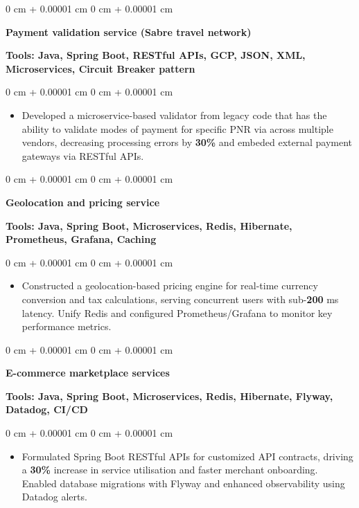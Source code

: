 \documentclass[10pt, letterpaper]{article}
\newenvironment{highlights}{
    \begin{itemize}[
        topsep=0.10 cm,
        parsep=0.10 cm,
        partopsep=0pt,
        itemsep=0pt,
        leftmargin=0 cm + 10pt
    ]
}{
    \end{itemize}
} %
\newenvironment{onecolentry}{
    \begin{adjustwidth}{
        0 cm + 0.00001 cm
    }{
        0 cm + 0.00001 cm
    }
}{
    \end{adjustwidth}
} %
\begin{document}
        \vspace{0.1 cm}
        \begin{onecolentry}
            \textbf{Payment validation service (Sabre travel network)}
        \end{onecolentry}
        \textbf{Tools: Java, Spring Boot, RESTful APIs, GCP, JSON, XML, Microservices, Circuit Breaker pattern}
        
        \vspace{0.10 cm}
        \begin{onecolentry}
            \begin{highlights}
                \item Developed a microservice-based validator from legacy code that has the ability to validate modes of payment for specific PNR via across multiple vendors, decreasing processing errors by \textbf{30\%} and embeded external payment gateways via RESTful APIs.
            \end{highlights}
        \end{onecolentry}
        
        \vspace{0.1 cm}
        \begin{onecolentry}
            \textbf{Geolocation and pricing service}
        \end{onecolentry}
        \textbf{Tools: Java, Spring Boot, Microservices, Redis, Hibernate, Prometheus, Grafana, Caching}
        \vspace{0.10 cm}
        \begin{onecolentry}
            \begin{highlights}
                \item Constructed a geolocation-based pricing engine for real-time currency conversion and tax calculations, serving concurrent users with sub-\textbf{200} ms latency. Unify Redis and configured Prometheus/Grafana to monitor key performance metrics.
            \end{highlights}
        \end{onecolentry}

        \vspace{0.1 cm}

        \begin{onecolentry}
            \textbf{E-commerce marketplace services}
        \end{onecolentry}
        \textbf{Tools: Java, Spring Boot, Microservices, Redis, Hibernate, Flyway, Datadog, CI/CD}
        \vspace{0.10 cm}
        \begin{onecolentry}
            \begin{highlights}
                \item Formulated Spring Boot RESTful APIs for customized API contracts, driving a \textbf{30\%} increase in service utilisation and faster merchant onboarding. Enabled database migrations with Flyway and enhanced observability using Datadog alerts.
                
            \end{highlights}
        \end{onecolentry}
    
\end{document}
